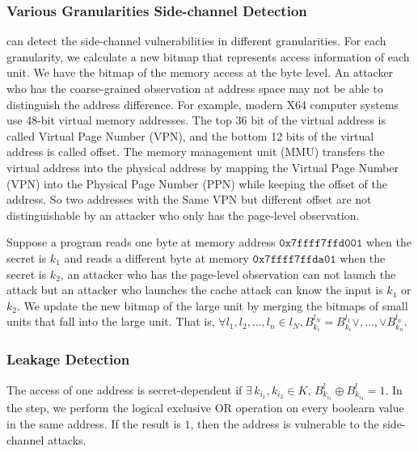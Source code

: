 \subsubsection{Various Granularities Side-channel Detection}
\ctool{} can detect the side-channel vulnerabilities in different granularities. For each granularity, we calculate a new bitmap that represents access information of each unit. We have the bitmap of the memory access at the byte level. An attacker who has the coarse-grained observation at address space may not be able to distinguish the address difference. For example, modern X64 computer systems use 48-bit virtual memory addresses. The top 36 bit of the virtual address is called Virtual Page Number (VPN), and the bottom 12 bits of the virtual address is called offset. The memory management unit (MMU) transfers the virtual address into the physical address by mapping the Virtual Page Number (VPN) into the Physical Page Number (PPN) while keeping the offset of the address. So two addresses with the Same VPN but different offset are not distinguishable by an attacker who only has the page-level observation. 

Suppose a program reads one byte at memory address
$\mathtt{0x7ffff7ffd001}$ when the secret is $k_1$ and reads a
different byte at memory $\mathtt{0x7ffff7ffda01}$ when the secret is
$k_2$, an attacker who has the page-level observation can not launch
the attack but an attacker who launches the cache attack can know the
input is $k_1$ or $k_2$. We update the new bitmap of the large unit by
merging the bitmaps of small units that fall into the large unit. That
is, $\forall
  l_1, l_2, \dots, l_n \in l_N, B^{l_N}_{k_i} = B^{l_1}_{k_i} \lor,\dots,\lor B^{l_n}_{k_n}$.


\subsubsection{Leakage Detection} 
The access of one address is secret-dependent if $ \exists\, k_{i_1}, k_{i_2} \in K, \, B^{l}_{k_{i_1}} \oplus  B^{l}_{k_{i_2}} =1 $. In the step, we perform the logical exclusive OR operation on every boolearn value in the same address. If the result is $1$, then the address is vulnerable to the side-channel attacks.

